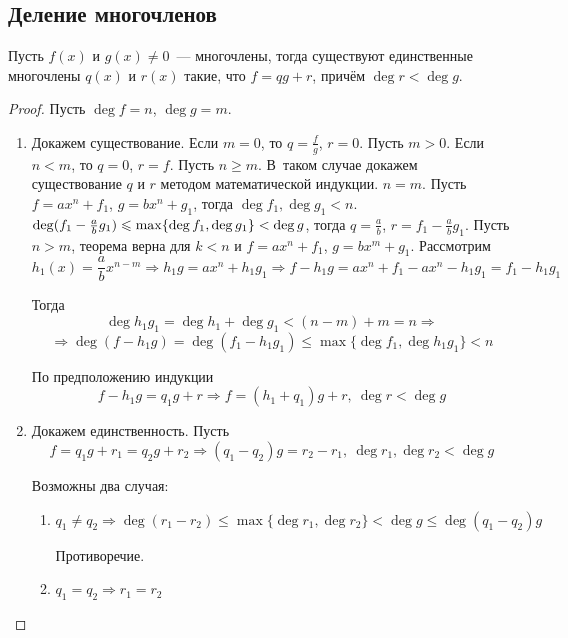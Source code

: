 \subsection{Деление многочленов}
\begin{theorem}
Пусть $f(x)$ и $g(x) \neq 0$~--- многочлены, тогда существуют единственные многочлены $q(x)$ и $r(x)$ такие, что $f = qg + r$, причём $\deg r < \deg g$.
\end{theorem}
\begin{proof}
Пусть $\deg f = n$, $\deg g = m$.
\begin{enumerate}
	\item Докажем существование.
	Если $m = 0$, то $q = \frac{f}g$, $r = 0$.
	Пусть $m > 0$.
	Если $n < m$, то $q = 0$, $r = f$.
	Пусть $n \geqslant m$.
	В~таком случае докажем существование $q$ и $r$ методом математической индукции.
		\indbase $n = m$.
		Пусть $f = a x^n + f_1$, $g = b x^n + g_1$, тогда $\deg f_1, \deg g_1 < n$.
		$\deg (f_1 - \frac{a}b g_1) \opbr\leqslant \max \{ \deg f_1, \deg g_1 \} \opbr< \deg g$, тогда $q = \frac{a}b$, $r = f_1 - \frac{a}b g_1$.
		\indstep Пусть $n > m$, теорема верна для $k < n$ и $f = a x^n + f_1$, $g = b x^m + g_1$.
		Рассмотрим
		\begin{equation*}
		h_1(x) = \frac{a}b x^{n-m} \Rightarrow
		h_1 g = a x^n + h_1 g_1 \Rightarrow
		f - h_1 g = a x^n + f_1 - a x^n - h_1 g_1 = f_1 - h_1 g_1
		\end{equation*}
		
		Тогда
		\begin{equation*}
		\deg h_1 g_1 = \deg h_1 + \deg g_1 < (n - m) + m = n \Rightarrow
		\end{equation*}
		\begin{equation*}
		\Rightarrow \deg (f - h_1 g) = \deg (f_1 - h_1 g_1) \leqslant \max \{ \deg f_1, \deg h_1 g_1 \} < n
		\end{equation*}
		
		По предположению индукции
		\begin{equation*}
		f - h_1 g = q_1 g + r \Rightarrow
		f = (h_1 + q_1)g + r, \ \deg r < \deg g
		\end{equation*}
		\indend
		
	\item Докажем единственность.
	Пусть
	\begin{equation*}
	f = q_1 g + r_1 = q_2 g + r_2 \Rightarrow
	(q_1 - q_2)g = r_2 - r_1, \ \deg r_1, \deg r_2 < \deg g
	\end{equation*}
	
	Возможны два случая:
	\begin{enumerate}
		\item $q_1 \neq q_2 \Rightarrow
		\deg (r_1 - r_2) \leqslant \max \{ \deg r_1, \deg r_2 \} < \deg g \leqslant \deg (q_1 - q_2)g$
		
		Противоречие.
		
		\item $q_1 = q_2 \Rightarrow r_1 = r_2$
	\end{enumerate}
\end{enumerate}
\end{proof}


